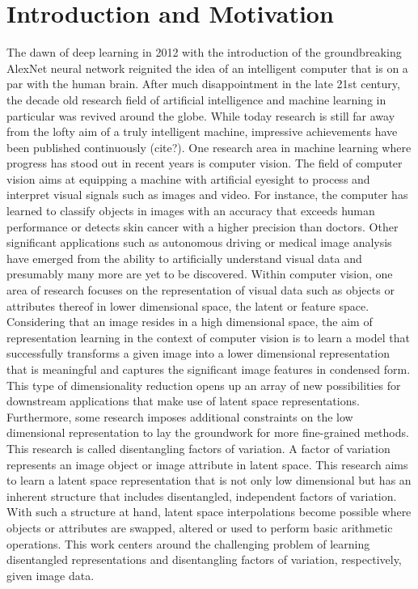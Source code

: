 \documentclass[12pt,a4paper]{article}
\begin{document}
\section{Introduction and Motivation}
The dawn of deep learning in 2012 with the introduction of the groundbreaking AlexNet neural network reignited the idea of an intelligent computer that is on a par with the human brain. After much disappointment in the late 21st century, the decade old research field of artificial intelligence and machine learning in particular was revived around the globe. While today research is still far away from the lofty aim of a truly intelligent machine, impressive achievements have been published continuously (cite?). One research area in machine learning where progress has stood out in recent years is computer vision. The field of computer vision aims at equipping a machine with artificial eyesight to process and interpret visual signals such as images and video. For instance, the computer has learned to classify objects in images with an accuracy that exceeds human performance or detects skin cancer with a higher precision than doctors. Other significant applications such as autonomous driving or medical image analysis have emerged from the ability to artificially understand visual data and presumably many more are yet to be discovered. Within computer vision, one area of research focuses on the representation of visual data such as objects or attributes thereof in lower dimensional space, the latent or feature space. Considering that an image resides in a high dimensional space, the aim of representation learning in the context of computer vision is to learn a model that successfully transforms a given image into a lower dimensional representation that is meaningful and captures the significant image features in condensed form. This type of dimensionality reduction opens up an array of new possibilities for downstream applications that make use of latent space representations. Furthermore, some research imposes additional constraints on the low dimensional representation to lay the groundwork for more fine-grained methods. This research is called disentangling factors of variation. A factor of variation represents an image object or image attribute in latent space. This research aims to learn a latent space representation that is not only low dimensional but has an inherent structure that includes disentangled, independent factors of variation. With such a structure at hand, latent space interpolations become possible where objects or attributes are swapped, altered or used to perform basic arithmetic operations. This work centers around the challenging problem of learning disentangled representations and disentangling factors of variation, respectively, given image data.
\end{document}
